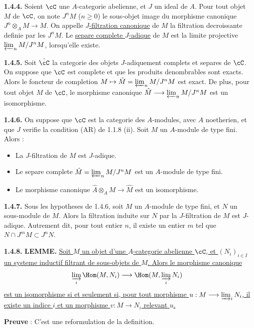 \medskip
\noindent\textbf{1.4.4.} Soient $\cC$ une $A$-categorie abelienne, et $J$ un ideal de $A$. Pour tout objet $M$ de $\cC$, on note $J^n M$ ($n \geq 0$) le sous-objet image du morphisme canonique $J^n \otimes_A M \longrightarrow M$. On appelle \underline{$J$-filtration canonique} de $M$ la filtration decroissante definie par les $J^n M$. Le \underline{separe complete $J$-adique} de $M$ est la limite projective $\varprojlim_n M/J^n M$, lorsqu'elle existe.

\medskip
\noindent\textbf{1.4.5.} Soit $\hat{\cC}$ la categorie des objets $J$-adiquement complets et separes de $\cC$. On suppose que $\cC$ est complete et que les produits denombrables sont exacts. Alors le foncteur de completion $M \mapsto \hat{M} = \varprojlim_n M/J^n M$ est exact. De plus, pour tout objet $M$ de $\cC$, le morphisme canonique $\hat{M} \longrightarrow \varprojlim_n M/J^n M$ est un isomorphisme.

\medskip
\noindent\textbf{1.4.6.} On suppose que $\cC$ est la categorie des $A$-modules, avec $A$ noetherien, et que $J$ verifie la condition (AR) de 1.1.8 (ii). Soit $M$ un $A$-module de type fini. Alors :
\begin{itemize}
\item[(i)] La $J$-filtration de $M$ est $J$-adique.
\item[(ii)] Le separe complete $\hat{M} = \varprojlim_n M/J^n M$ est un $A$-module de type fini.
\item[(iii)] Le morphisme canonique $\hat{A} \otimes_A M \longrightarrow \hat{M}$ est un isomorphisme.
\end{itemize}

\medskip
\noindent\textbf{1.4.7.} Sous les hypotheses de 1.4.6, soit $M$ un $A$-module de type fini, et $N$ un sous-module de $M$. Alors la filtration induite sur $N$ par la $J$-filtration de $M$ est $J$-adique. Autrement dit, pour tout entier $n$, il existe un entier $m$ tel que $N \cap J^m M \subset J^n N$.

\medskip
\noindent\textbf{1.4.8.} \textbf{LEMME.} \underline{Soit $M$ un objet d'une $A$-categorie abelienne $\cC$, et $(N_i)_{i \in I}$ un systeme inductif filtrant de sous-objets de $M$. Alors le morphisme canonique}
\[
\varinjlim_i \Hom(M,N_i) \longrightarrow \Hom(M, \varinjlim_i N_i)
\]
\underline{est un isomorphisme si et seulement si, pour tout morphisme $u : M \longrightarrow \varinjlim_i N_i$, il existe un indice $i$ et un morphisme $v : M \longrightarrow N_i$ relevant $u$.}

\textbf{Preuve} : C'est une reformulation de la definition.

